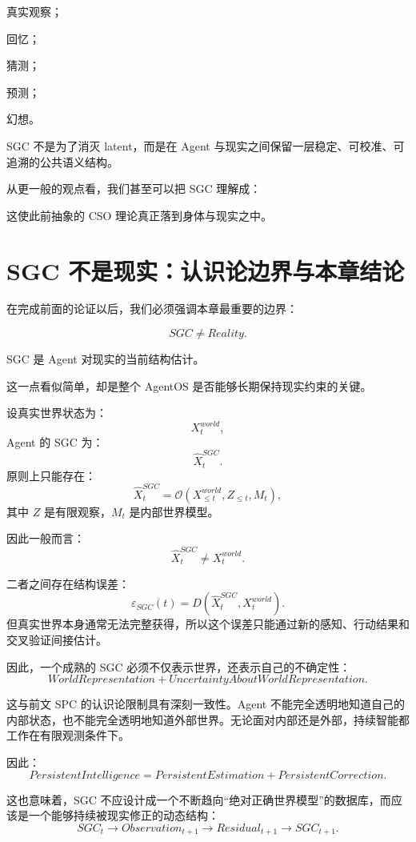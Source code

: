 真实观察；

回忆；

猜测；

预测；

幻想。

SGC 不是为了消灭 latent，而是在 Agent 与现实之间保留一层稳定、可校准、可追溯的公共语义结构。

从更一般的观点看，我们甚至可以把 SGC 理解成：
\begin{statementbox}
\centering
{}
\end{statementbox}

这使此前抽象的 CSO 理论真正落到身体与现实之中。

\section{SGC 不是现实：认识论边界与本章结论}

在完成前面的论证以后，我们必须强调本章最重要的边界：

\[
\boxed{
SGC\neq Reality.
}
\]

SGC 是 Agent 对现实的当前结构估计。

这一点看似简单，却是整个 AgentOS 是否能够长期保持现实约束的关键。

设真实世界状态为：
\[
X_t^{world},
\]
Agent 的 SGC 为：
\[
\hat X_t^{SGC}.
\]
原则上只能存在：
\[
\hat X_t^{SGC}
=
\mathcal O
\left(
X_{\leq t}^{world},
Z_{\leq t},
M_t
\right),
\]
其中 \(Z\) 是有限观察，\(M_t\) 是内部世界模型。

因此一般而言：
\[
\hat X_t^{SGC}
\neq
X_t^{world}.
\]

二者之间存在结构误差：
\[
\varepsilon_{SGC}(t)
=
D
\left(
\hat X_t^{SGC},
X_t^{world}
\right).
\]
但真实世界本身通常无法完整获得，所以这个误差只能通过新的感知、行动结果和交叉验证间接估计。

因此，一个成熟的 SGC 必须不仅表示世界，还表示自己的不确定性：
\[
\boxed{
WorldRepresentation
+
UncertaintyAboutWorldRepresentation.
}
\]

这与前文 SPC 的认识论限制具有深刻一致性。Agent 不能完全透明地知道自己的内部状态，也不能完全透明地知道外部世界。无论面对内部还是外部，持续智能都工作在有限观测条件下。

因此：
\[
\boxed{
PersistentIntelligence
=
PersistentEstimation
+
PersistentCorrection.
}
\]

这也意味着，SGC 不应设计成一个不断趋向“绝对正确世界模型”的数据库，而应该是一个能够持续被现实修正的动态结构：
\[
SGC_t
\rightarrow
Observation_{t+1}
\rightarrow
Residual_{t+1}
\rightarrow
SGC_{t+1}.
\]

